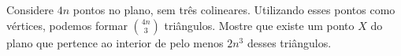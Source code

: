 Considere $4n$ pontos no plano, sem três colineares. Utilizando esses pontos como vértices, podemos formar $\binom{4n}{3}$ triângulos. Mostre que existe um ponto $X$ do plano que pertence ao interior de pelo menos $2n^3$ desses triângulos.

